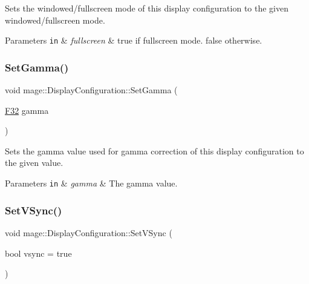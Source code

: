 Sets the windowed/fullscreen mode of this display configuration to the given windowed/fullscreen mode.


\begin{DoxyParams}[1]{Parameters}
\mbox{\tt in}  & {\em fullscreen} & {\ttfamily true} if fullscreen mode. {\ttfamily false} otherwise. \\
\hline
\end{DoxyParams}
\hypertarget{structmage_1_1_display_configuration_a83f33815b5a7d644e33335781a549718}{}\label{structmage_1_1_display_configuration_a83f33815b5a7d644e33335781a549718} 
\subsubsection{\texorpdfstring{Set\+Gamma()}{SetGamma()}}
{\footnotesize\ttfamily void mage\+::\+Display\+Configuration\+::\+Set\+Gamma (\begin{DoxyParamCaption}\item[{\hyperlink{namespacemage_aa97e833b45f06d60a0a9c4fc22ae02c0}{F32}}]{gamma }\end{DoxyParamCaption})\hspace{0.3cm}{\ttfamily [noexcept]}}

Sets the gamma value used for gamma correction of this display configuration to the given value.


\begin{DoxyParams}[1]{Parameters}
\mbox{\tt in}  & {\em gamma} & The gamma value. \\
\hline
\end{DoxyParams}
\hypertarget{structmage_1_1_display_configuration_a7a14343be4f07dcdf4e8be66a118da29}{}\label{structmage_1_1_display_configuration_a7a14343be4f07dcdf4e8be66a118da29} 
\subsubsection{\texorpdfstring{Set\+V\+Sync()}{SetVSync()}}
{\footnotesize\ttfamily void mage\+::\+Display\+Configuration\+::\+Set\+V\+Sync (\begin{DoxyParamCaption}\item[{bool}]{vsync = {\ttfamily true} }\end{DoxyParamCaption})\hspace{0.3cm}{\ttfamily [noexcept]}}

